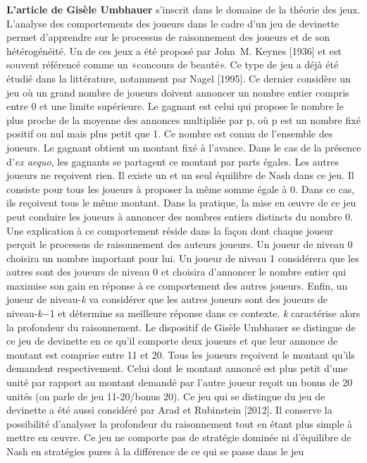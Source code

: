 \begin{Article}
\begin{refsection}[Intro]
\textbf{L'article de Gisèle Umbhauer} s'inscrit dans le domaine de la
théorie des jeux. L'analyse des comportements des joueurs dans le cadre
d'un jeu de devinette permet d'apprendre sur le processus de
raisonnement des joueurs et de son hétérogénéité. Un de ces jeux a été
proposé par John~M. Keynes [1936] et est souvent référencé comme un
«concours de beauté». Ce type de jeu a déjà été étudié dans la
littérature, notamment par Nagel [1995]. Ce dernier considère un jeu où
un grand nombre de joueurs doivent annoncer un nombre entier compris
entre 0 et une limite supérieure. Le gagnant est celui qui propose le
nombre le plus proche de la moyenne des annonces multipliée par p, où p
est un nombre fixé positif ou nul mais plus petit que 1. Ce nombre est
connu de l'ensemble des joueurs. Le gagnant obtient un montant fixé à
l'avance. Dans le cas de la présence d'\emph{ex aequo}, les gagnants se
partagent ce montant par parts égales. Les autres joueurs ne reçoivent
rien. Il existe un et un seul équilibre de Nash dans ce jeu. Il consiste
pour tous les joueurs à proposer la même somme égale à 0. Dans ce cas,
ils reçoivent tous le même montant. Dans la pratique, la mise en œuvre
de ce jeu peut conduire les joueurs à annoncer des nombres entiers
distincts du nombre 0. Une explication à ce comportement réside dans la
façon dont chaque joueur perçoit le processus de raisonnement des auteurs
joueurs. Un joueur de niveau 0 choisira un nombre important pour lui. Un
joueur de niveau 1 considérera que les autres sont des joueurs de niveau
0 et choisira d'annoncer le nombre entier qui maximise son gain en
réponse à ce comportement des autres joueurs. Enfin, un joueur de
niveau-\emph{k} va considérer que les autres joueurs sont des joueurs de niveau-\emph{k}$-$1 et détermine sa meilleure réponse dans ce contexte. \emph{k} caractérise
alors la profondeur du raisonnement. Le dispositif de Gisèle Umbhauer se
distingue de ce jeu de devinette en ce qu'il comporte deux joueurs et
que leur annonce de montant est comprise entre 11 et 20. Tous les
joueurs reçoivent le montant qu'ils demandent respectivement. Celui dont
le montant annoncé est plus petit d'une unité par rapport au montant demandé par
l'autre joueur reçoit un bonus de 20 unités (on parle de jeu 11-20/bonus
20). Ce jeu qui se distingue du jeu de devinette a été aussi considéré
par Arad et Rubinstein [2012]. Il conserve la possibilité d'analyser
la profondeur du raisonnement tout en étant plus simple à mettre en
œuvre. Ce jeu ne comporte pas de stratégie dominée ni d'équilibre de
Nash en stratégies pures à la différence de ce qui se passe dans le jeu

\end{refsection}
\end{Article}

